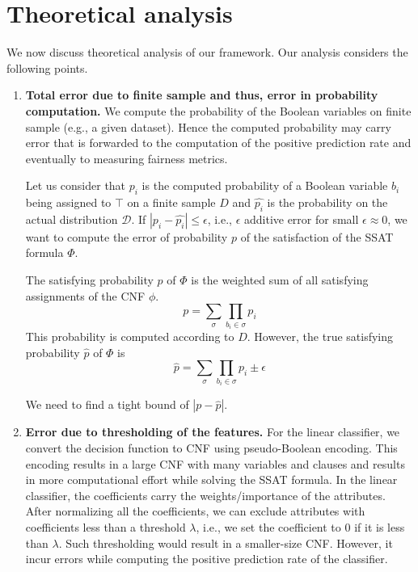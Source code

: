 \section{Theoretical analysis}

We now discuss theoretical analysis of our framework. Our analysis considers the following points.

\begin{enumerate}
	\item \textbf{Total error due to finite sample and thus, error in probability computation.} We compute the probability of the Boolean variables on finite sample (e.g., a given dataset). Hence the computed probability may carry error that is forwarded to the computation of the positive prediction rate and eventually to measuring fairness metrics. 
	
	Let us consider that $ p_i $ is the computed probability of a Boolean variable $ b_i $ being assigned to $ \top $ on a finite sample $ D $ and $ \hat{p_i} $ is the probability  on the actual distribution $ \mathcal{D} $. If $ | p_i - \hat{p_i}| \le \epsilon $, i.e., $ \epsilon $ additive error for small $ \epsilon \approx 0 $, we want to compute the error of probability $ p $ of the satisfaction of the SSAT formula $ \Phi $.  
	
	 The satisfying probability $ p $ of $ \Phi $ is the weighted sum of all satisfying assignments of the CNF $ \phi $. 
	\[
		p = \sum_\sigma \prod_{b_i \in \sigma}p_i	
	\]
	This probability is computed according to $ D $. However, the true satisfying probability $ \hat{p} $  of $ \Phi $ is 
	\[
		\hat{p} = \sum_\sigma \prod_{b_i \in \sigma}p_i \pm \epsilon	
	\]
	
	We need to find a tight bound of $ |p - \hat{p}| $. 
	
	\item \textbf{Error due to thresholding of the features.} For the linear classifier, we convert the decision function to CNF using pseudo-Boolean encoding. This encoding results in a large CNF with many variables and clauses and results in more computational effort while solving the SSAT formula. In the linear classifier, the coefficients carry the weights/importance of the attributes. After normalizing all the coefficients, we can exclude attributes with coefficients less than a threshold $ \lambda $, i.e., we set the coefficient to $ 0 $ if it is less than $ \lambda $. Such thresholding would result in a smaller-size CNF. However, it  incur errors while computing the positive prediction rate of the classifier. 
	

\end{enumerate}
